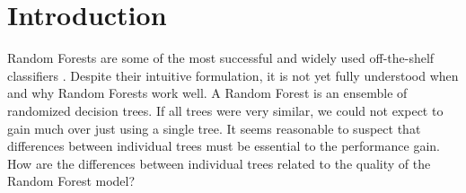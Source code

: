 \documentclass[
	twoside=false, %
]{kaobook}
\begin{document}

\begingroup %

\setlength{\textheight}{230\vscale} %

\etocstandarddisplaystyle %
\etocstandardlines %

\tableofcontents %


\let\cleardoublepage\bigskip
\let\clearpage\bigskip


\endgroup


\mainmatter %

\renewcommand{\marginlayout}{%
 \newgeometry{
	top=27.4mm,
	bottom=27.4mm,
	inner=24.8mm,
	textwidth=127mm, %
	marginparsep=5.2mm,
	marginparwidth=39.4mm 
 }%
}


\chapter{Introduction}

Random Forests are some of the most successful and widely used off-the-shelf classifiers
\cite{biau_RandomForestGuided_2016,yang_ReviewEnsembleMethods_2010}. Despite their intuitive formulation, it is not yet fully understood when and why Random Forests work well. 
A Random Forest is an ensemble of randomized decision trees.
If all trees were very similar, we could not expect to gain much over just using a single tree.  
It seems reasonable to suspect that differences between individual trees must be essential to the performance gain. How are the differences between individual trees related to the quality of the Random Forest model?
\end{document}
